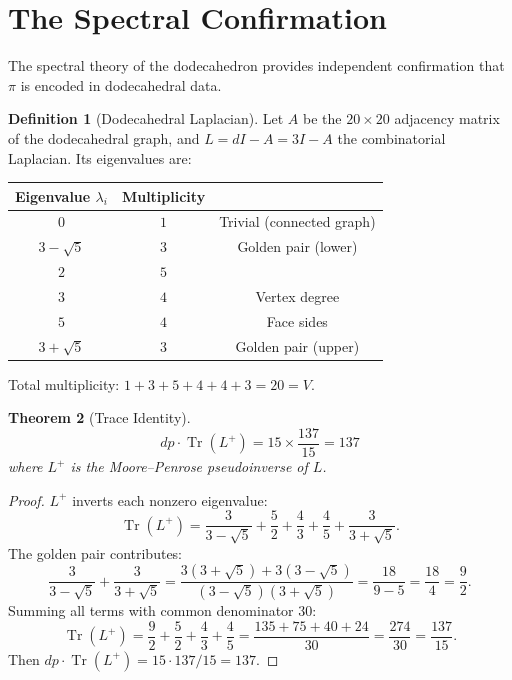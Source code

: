 \documentclass[11pt,a4paper]{article}
\theoremstyle{plain}
\newtheorem{theorem}{Theorem}[section]
\theoremstyle{definition}
\newtheorem{definition}[theorem]{Definition}
\newcommand{\Tr}{\operatorname{Tr}}
\begin{document}
\section{The Spectral Confirmation}\label{sec:spectral}

The spectral theory of the dodecahedron provides independent confirmation
that $\pi$ is encoded in dodecahedral data.

\begin{definition}[Dodecahedral Laplacian]\label{def:laplacian}
Let $A$ be the $20 \times 20$ adjacency matrix of the dodecahedral graph,
and $L = dI - A = 3I - A$ the combinatorial Laplacian. Its eigenvalues
are:
\begin{center}
\begin{tabular}{@{}ccc@{}}
\toprule
Eigenvalue $\lambda_i$ & Multiplicity & \\
\midrule
$0$ & $1$ & Trivial (connected graph) \\
$3 - \sqrt{5}$ & $3$ & Golden pair (lower) \\
$2$ & $5$ & \\
$3$ & $4$ & Vertex degree \\
$5$ & $4$ & Face sides \\
$3 + \sqrt{5}$ & $3$ & Golden pair (upper) \\
\bottomrule
\end{tabular}
\end{center}
Total multiplicity: $1 + 3 + 5 + 4 + 4 + 3 = 20 = V$.
\end{definition}

\begin{theorem}[Trace Identity]\label{thm:trace}
\begin{equation}\label{eq:trace-137}
  dp \cdot \Tr(L^+) = 15 \times \frac{137}{15} = 137
\end{equation}
where $L^+$ is the Moore--Penrose pseudoinverse of $L$.
\end{theorem}

\begin{proof}
$L^+$ inverts each nonzero eigenvalue:
\[
  \Tr(L^+)
  = \frac{3}{3-\sqrt{5}} + \frac{5}{2} + \frac{4}{3}
    + \frac{4}{5} + \frac{3}{3+\sqrt{5}}.
\]
The golden pair contributes:
\[
  \frac{3}{3-\sqrt{5}} + \frac{3}{3+\sqrt{5}}
  = \frac{3(3+\sqrt{5}) + 3(3-\sqrt{5})}{(3-\sqrt{5})(3+\sqrt{5})}
  = \frac{18}{9-5} = \frac{18}{4} = \frac{9}{2}.
\]
Summing all terms with common denominator $30$:
\[
  \Tr(L^+) = \frac{9}{2} + \frac{5}{2} + \frac{4}{3} + \frac{4}{5}
  = \frac{135 + 75 + 40 + 24}{30}
  = \frac{274}{30}
  = \frac{137}{15}.
\]
Then $dp \cdot \Tr(L^+) = 15 \cdot 137/15 = 137$.
\end{proof}
\end{document}
